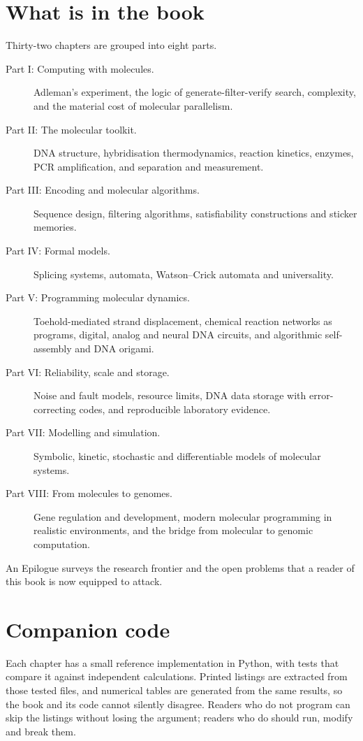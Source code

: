 \section*{What is in the book}
Thirty-two chapters are grouped into eight parts.
\begin{description}
\item[Part I: Computing with molecules.] Adleman's experiment, the logic of
generate-filter-verify search, complexity, and the material cost of
molecular parallelism.
\item[Part II: The molecular toolkit.] DNA structure, hybridisation
thermodynamics, reaction kinetics, enzymes, PCR amplification, and
separation and measurement.
\item[Part III: Encoding and molecular algorithms.] Sequence design, filtering
algorithms, satisfiability constructions and sticker memories.
\item[Part IV: Formal models.] Splicing systems, automata, Watson--Crick
automata and universality.
\item[Part V: Programming molecular dynamics.] Toehold-mediated strand
displacement, chemical reaction networks as programs, digital, analog and
neural DNA circuits, and algorithmic self-assembly and DNA origami.
\item[Part VI: Reliability, scale and storage.] Noise and fault models,
resource limits, DNA data storage with error-correcting codes, and
reproducible laboratory evidence.
\item[Part VII: Modelling and simulation.] Symbolic, kinetic, stochastic and
differentiable models of molecular systems.
\item[Part VIII: From molecules to genomes.] Gene regulation and development,
modern molecular programming in realistic environments, and the bridge from
molecular to genomic computation.
\end{description}
An Epilogue surveys the research frontier and the open problems that a reader
of this book is now equipped to attack.

\section*{Companion code}
Each chapter has a small reference implementation in Python, with tests that
compare it against independent calculations. Printed listings are extracted
from those tested files, and numerical tables are generated from the same
results, so the book and its code cannot silently disagree. Readers who do not
program can skip the listings without losing the argument; readers who do
should run, modify and break them.

